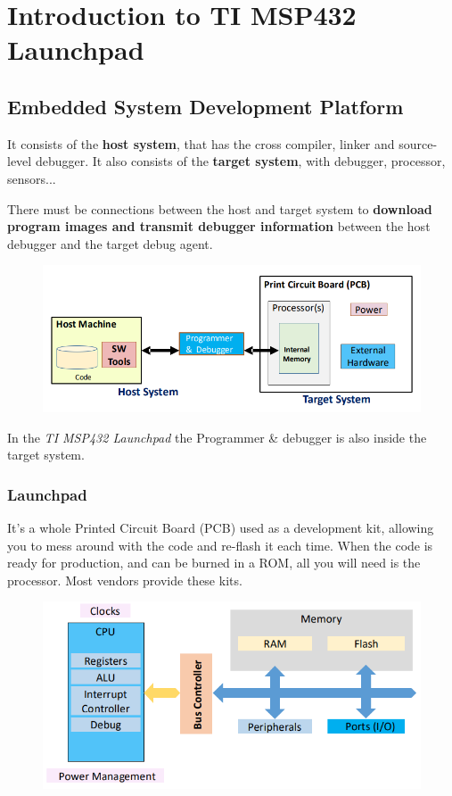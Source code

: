 \chapter{Introduction to TI MSP432 Launchpad}

\section{Embedded System Development Platform}

It consists of the \textbf{host system}, that has the cross compiler, linker and source-level debugger.
It also consists of the \textbf{target system}, with debugger, processor, sensors...


There must be connections between the host and target system to \textbf{download program images and
transmit debugger information} between the host debugger and the target debug agent.

\begin{figure}[H]
    \centering
    \includegraphics[width=0.8\linewidth]{img/image50.png}
\end{figure}

In the \textit{TI MSP432 Launchpad} the Programmer \& debugger is also inside the target system.

\subsection{Launchpad}
It's a whole Printed Circuit Board (PCB) used as a development kit, allowing you to mess around with the
code and re-flash it each time. When the code is ready for production, and can be burned in a ROM, all
you will need is the processor. Most vendors provide these kits.
\begin{figure}[H]
    \centering
    \includegraphics[width=0.7\linewidth]{img/image51.png}
\end{figure}

